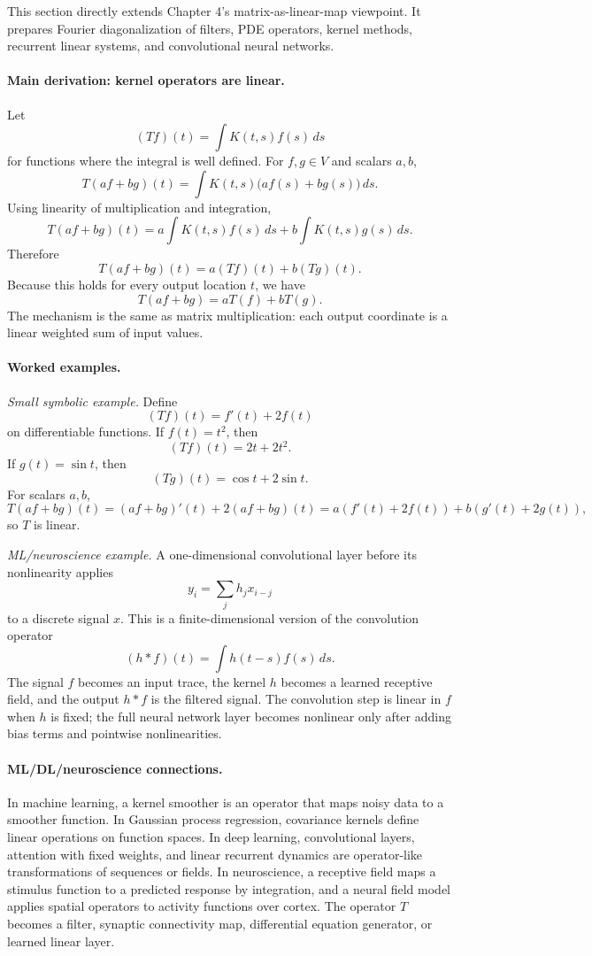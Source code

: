This section directly extends Chapter 4's matrix-as-linear-map viewpoint. It prepares Fourier diagonalization of filters, PDE operators, kernel methods, recurrent linear systems, and convolutional neural networks.

\paragraph{Main derivation: kernel operators are linear.}
Let
\[
(Tf)(t)=\int K(t,s)f(s)\,ds
\]
for functions where the integral is well defined. For \(f,g\in V\) and scalars \(a,b\),
\[
T(af+bg)(t)
=\int K(t,s)\bigl(af(s)+bg(s)\bigr)\,ds.
\]
Using linearity of multiplication and integration,
\[
T(af+bg)(t)
=a\int K(t,s)f(s)\,ds
+b\int K(t,s)g(s)\,ds.
\]
Therefore
\[
T(af+bg)(t)
=a(Tf)(t)+b(Tg)(t).
\]
Because this holds for every output location \(t\), we have
\[
T(af+bg)=aT(f)+bT(g).
\]
The mechanism is the same as matrix multiplication: each output coordinate is a linear weighted sum of input values.

\paragraph{Worked examples.}
\emph{Small symbolic example.} Define
\[
(Tf)(t)=f'(t)+2f(t)
\]
on differentiable functions. If \(f(t)=t^2\), then
\[
(Tf)(t)=2t+2t^2.
\]
If \(g(t)=\sin t\), then
\[
(Tg)(t)=\cos t+2\sin t.
\]
For scalars \(a,b\),
\[
T(af+bg)(t)
=(af+bg)'(t)+2(af+bg)(t)
=a(f'(t)+2f(t))+b(g'(t)+2g(t)),
\]
so \(T\) is linear.

\emph{ML/neuroscience example.} A one-dimensional convolutional layer before its nonlinearity applies
\[
y_i=\sum_j h_j x_{i-j}
\]
to a discrete signal \(x\). This is a finite-dimensional version of the convolution operator
\[
(h*f)(t)=\int h(t-s)f(s)\,ds.
\]
The signal \(f\) becomes an input trace, the kernel \(h\) becomes a learned receptive field, and the output \(h*f\) is the filtered signal. The convolution step is linear in \(f\) when \(h\) is fixed; the full neural network layer becomes nonlinear only after adding bias terms and pointwise nonlinearities.

\paragraph{ML/DL/neuroscience connections.}
In machine learning, a kernel smoother is an operator that maps noisy data to a smoother function. In Gaussian process regression, covariance kernels define linear operations on function spaces. In deep learning, convolutional layers, attention with fixed weights, and linear recurrent dynamics are operator-like transformations of sequences or fields. In neuroscience, a receptive field maps a stimulus function to a predicted response by integration, and a neural field model applies spatial operators to activity functions over cortex. The operator \(T\) becomes a filter, synaptic connectivity map, differential equation generator, or learned linear layer.


